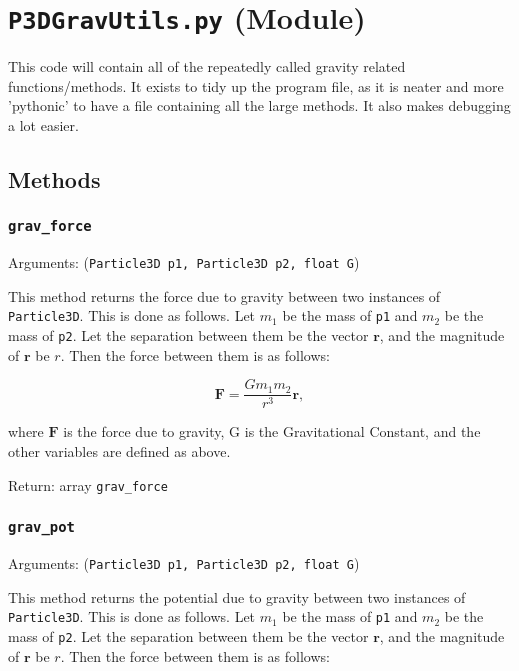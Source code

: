 \documentclass[a4paper, 11pt, british, left=1in, right=1in, top=0.3in, bottom=1in]{article}
\begin{document}
	\pagebreak
	
	\section{\texttt{P3DGravUtils.py} (Module)}
	
	This code will contain all of the repeatedly called gravity related functions/methods. It exists to tidy up the program file, as it is neater and more 'pythonic' to have a file containing all the large methods. It also makes debugging a lot easier. 
	
	\subsection{Methods}
	
	\subsubsection{\texttt{grav\_force}}
	
	Arguments: (\texttt{Particle3D p1, Particle3D p2, float G})
	
	This method returns the force due to gravity between two instances of \texttt{Particle3D}. This is done as follows. Let $m_1$ be the mass of \texttt{p1} and $m_2$ be the mass of \texttt{p2}. Let the separation between them be the vector $\textbf{r}$, and the magnitude of $\textbf{r}$ be $r$. Then the force between them is as follows:
	
	$$\textbf{F} = \frac{Gm_1m_2}{r^3}\textbf{r},$$
	
	where $\textbf{F}$ is the force due to gravity, G is the Gravitational Constant, and the other variables are defined as above. 
	
	Return: array \texttt{grav\_force}
	
	\subsubsection{\texttt{grav\_pot}}
	
	Arguments: (\texttt{Particle3D p1, Particle3D p2, float G})
	
	This method returns the potential due to gravity between two instances of \texttt{Particle3D}. This is done as follows. Let $m_1$ be the mass of \texttt{p1} and $m_2$ be the mass of \texttt{p2}. Let the separation between them be the vector $\textbf{r}$, and the magnitude of $\textbf{r}$ be $r$. Then the force between them is as follows:
	
\end{document}
